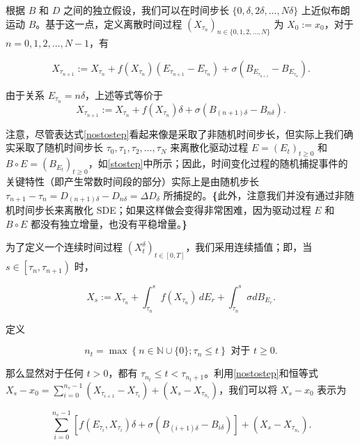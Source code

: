 根据 \( B \) 和 \( D \) 之间的独立假设，我们可以在时间步长 \(\{0, \delta, 2\delta, \ldots, N\delta\}\) 上近似布朗运动 \( B \)。基于这一点，定义离散时间过程 \(\left(X_{\tau_n}\right)_{n\in\{0,1,2,\ldots, N\}}\) 为 \( X_0 := x_0 \)，对于 \( n = 0, 1, 2, \ldots, N-1 \)，有

\begin{equation}\label{stostep}
	X_{\tau_{n+1}} := X_{\tau_n}  + f\left(X_{\tau_n}\right)\left(E_{\tau_{n+1}}-E_{\tau_n}\right)  + \sigma\left(B_{E_{\tau_{n+1}}}-B_{E_{\tau_n}}\right).
\end{equation}


由于关系 \( E_{\tau_{n}} = n\delta \)，上述等式等价于
\begin{equation}\label{nostostep}
	X_{\tau_{n+1}} :=X_{\tau_n}  + f\left(X_{\tau_n}\right)\delta + \sigma\left(B_{(n+1)\delta}-B_{n\delta}\right).
\end{equation}

注意，尽管表达式\cref{nostostep}看起来像是采取了非随机时间步长，但实际上我们确实采取了随机时间步长 \(\tau_0, \tau_1, \tau_2, \ldots, \tau_N\) 来离散化驱动过程 \( E = \left(E_t\right)_{t \geq 0} \) 和 \( B \circ E = \left(B_{E_t}\right)_{t \geq 0} \)，如\cref{stostep}中所示；因此，时间变化过程的随机捕捉事件的关键特性（即产生常数时间段的部分）实际上是由随机步长 \(\tau_{n+1} - \tau_n = D_{(n+1)\delta} - D_{n\delta} = \Delta D_{\delta}\) 所捕捉的。\textbf{\{}此外，注意我们并没有通过非随机时间步长来离散化 SDE；如果这样做会变得非常困难，因为驱动过程 \( E \) 和 \( B \circ E \) 都没有独立增量，也没有平稳增量。\textbf{\}}

为了定义一个连续时间过程 \(\left(X_t^\delta\right)_{t\in[0, T]}\)，我们采用连续插值；即，当 \(s \in \left[\tau_n, \tau_{n+1}\right)\) 时，

\begin{equation}\label{intX}
	X_s:= X_{\tau_n} +  \int_{\tau_n}^s f\left(X_{\tau_n}\right) \, dE_r + \int_{\tau_n}^s \sigma dB_{E_r}.
\end{equation}


定义

\[
n_t = \max\left\{n \in \mathbb{N} \cup \{0\}; \tau_n \leq t\right\} \text{ 对于 } t \geq 0.
\]

那么显然对于任何 \( t > 0 \)，都有 \( \tau_{n_t} \leq t < \tau_{n_t+1} \)。利用\cref{nostostep}和恒等式 \( X_s - x_0 = \sum_{i=0}^{n_s-1} \left(X_{\tau_{i+1}} - X_{\tau_i}\right) + \left(X_s - X_{\tau_{n_s}}\right) \)，我们可以将 \( X_s - x_0 \) 表示为

\[
\sum_{i=0}^{n_s-1} \left[ f\left(E_{\tau_i}, X_{\tau_i}\right)\delta + \sigma\left(B_{(i+1)\delta} - B_{i\delta}\right)\right] + \left(X_s - X_{\tau_{n_s}}\right).
\]

